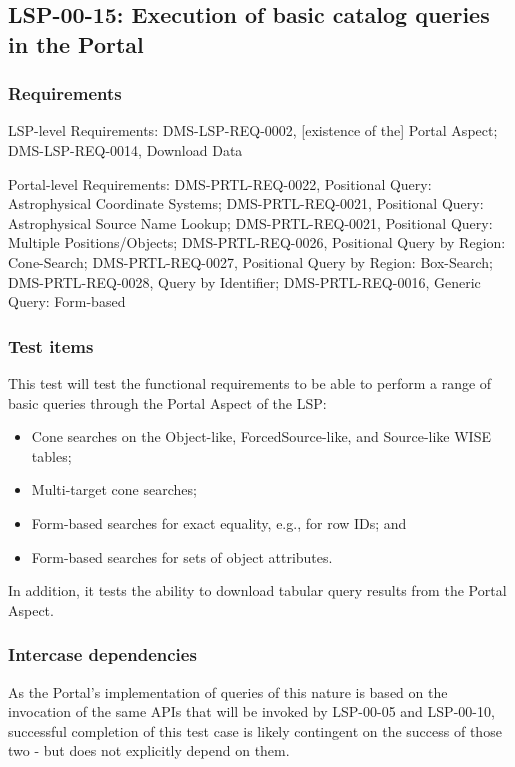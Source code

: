 \subsection{LSP-00-15: Execution of basic catalog queries in the Portal}
\label{lsp-00-15}

\subsubsection{Requirements}

LSP-level Requirements: DMS-LSP-REQ-0002, [existence of the] Portal Aspect; DMS-LSP-REQ-0014, Download Data

Portal-level Requirements: DMS-PRTL-REQ-0022, Positional Query: Astrophysical Coordinate Systems; DMS-PRTL-REQ-0021, Positional Query: Astrophysical Source Name Lookup; DMS-PRTL-REQ-0021, Positional Query: Multiple Positions/Objects; DMS-PRTL-REQ-0026, Positional Query by Region: Cone-Search; DMS-PRTL-REQ-0027, Positional Query by Region: Box-Search; DMS-PRTL-REQ-0028, Query by Identifier; DMS-PRTL-REQ-0016, Generic Query: Form-based

\subsubsection{Test items}

This test will test the functional requirements to be able to perform a range of basic queries through the Portal Aspect of the LSP:

\begin{itemize}

  \item{Cone searches on the Object-like, ForcedSource-like, and Source-like WISE tables;}
  \item{Multi-target cone searches;}
  \item{Form-based searches for exact equality, e.g., for row IDs; and}
  \item{Form-based searches for sets of object attributes.}

\end{itemize}

In addition, it tests the ability to download tabular query results from the Portal Aspect.

\subsubsection{Intercase dependencies}

As the Portal's implementation of queries of this nature is based on the invocation of the same APIs that will be invoked by LSP-00-05 and LSP-00-10, successful completion of this test case is likely contingent on the success of those two - but does not explicitly depend on them.

